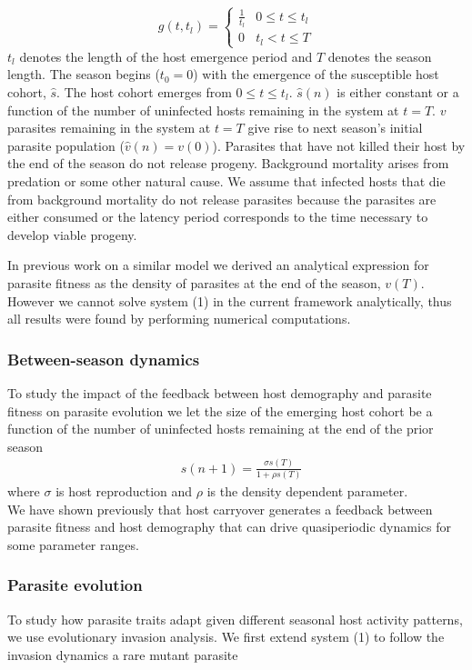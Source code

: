 \documentclass{article}
\begin{document}
 \[ g(t,t_{l}) = \begin{cases}
          \frac{1}{t_{l}} & 0 \leq t\leq t_{l} \\
          0 & t_{l}< t\leq T
       \end{cases}
    \]
$t_{l}$ denotes the length of the host emergence period and $T$ denotes the season length. The season begins ($t_{0}=0$) with the emergence of the susceptible host cohort, $\hat{s}$. The host cohort emerges from $0 \leq t\leq t_{l}.$ $\hat{s}(n)$ is either constant or a function of the number of uninfected hosts remaining in the system at $t = T$. $v$ parasites remaining in the system at $t = T$ give rise to next season's initial parasite population ($\hat{v}(n) = v(0)$). Parasites that have not killed their host by the end of the season do not release progeny. Background mortality arises from predation or some other natural cause. We assume that infected hosts that die from background mortality do not release parasites because the parasites are either consumed or the latency period corresponds to the time necessary to develop viable progeny\cite{wang2006lysis,white2011determinants}. 

In previous work on a similar model we derived an analytical expression for parasite fitness as the density of parasites at the end of the season, $v(T)$\cite{macdonald2021host}. However we cannot solve system (1) in the current framework analytically, thus all results were found by performing numerical computations.

\subsubsection{Between-season dynamics}
To study the impact of the feedback between host demography and parasite fitness on parasite evolution we let the size of the emerging host cohort be a function of the number of uninfected hosts remaining at the end of the prior season
\begin{align*}
    &\hat{s}(n+1) = \frac{\sigma s(T)}{1+\rho s(T)}
\end{align*}
\noindent where $\sigma$ is host reproduction and $\rho$ is the density dependent parameter. \\

\noindent We have shown previously that host carryover generates a feedback between parasite fitness and host demography that can drive quasiperiodic dynamics for some parameter ranges\cite{}.

\subsubsection{Parasite evolution}
\noindent To study how parasite traits adapt given different seasonal host activity patterns, we use evolutionary invasion analysis\cite{metz1992should,geritz1998evolutionarily}. We first extend system (1) to follow the invasion dynamics a rare mutant parasite
\end{document}
